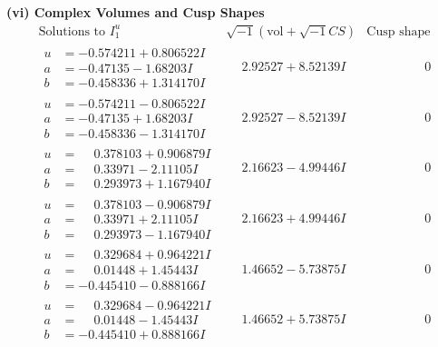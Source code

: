 \documentclass[1p]{elsarticle_modified}
\theoremstyle{definition}
\newcommand{\I}{\sqrt{-1}}
\begin{document}
\newpage\flushleft \textbf{(vi) Complex Volumes and Cusp Shapes}
$$\begin{array}{c|c|c}  
\text{Solutions to }I^u_{1}& \I (\text{vol} + \sqrt{-1}CS) & \text{Cusp shape}\\
 \hline 
\begin{aligned}
u &= -0.574211 + 0.806522 I \\
a &= -0.47135 - 1.68203 I \\
b &= -0.458336 + 1.314170 I\end{aligned}
 & \phantom{-}2.92527 + 8.52139 I & \phantom{-0.000000 } 0 \\ \hline\begin{aligned}
u &= -0.574211 - 0.806522 I \\
a &= -0.47135 + 1.68203 I \\
b &= -0.458336 - 1.314170 I\end{aligned}
 & \phantom{-}2.92527 - 8.52139 I & \phantom{-0.000000 } 0 \\ \hline\begin{aligned}
u &= \phantom{-}0.378103 + 0.906879 I \\
a &= \phantom{-}0.33971 - 2.11105 I \\
b &= \phantom{-}0.293973 + 1.167940 I\end{aligned}
 & \phantom{-}2.16623 - 4.99446 I & \phantom{-0.000000 } 0 \\ \hline\begin{aligned}
u &= \phantom{-}0.378103 - 0.906879 I \\
a &= \phantom{-}0.33971 + 2.11105 I \\
b &= \phantom{-}0.293973 - 1.167940 I\end{aligned}
 & \phantom{-}2.16623 + 4.99446 I & \phantom{-0.000000 } 0 \\ \hline\begin{aligned}
u &= \phantom{-}0.329684 + 0.964221 I \\
a &= \phantom{-}0.01448 + 1.45443 I \\
b &= -0.445410 - 0.888166 I\end{aligned}
 & \phantom{-}1.46652 - 5.73875 I & \phantom{-0.000000 } 0 \\ \hline\begin{aligned}
u &= \phantom{-}0.329684 - 0.964221 I \\
a &= \phantom{-}0.01448 - 1.45443 I \\
b &= -0.445410 + 0.888166 I\end{aligned}
 & \phantom{-}1.46652 + 5.73875 I & \phantom{-0.000000 } 0 \\ \hline\begin{aligned}

\end{aligned}
\end{array}$$
\end{document}
